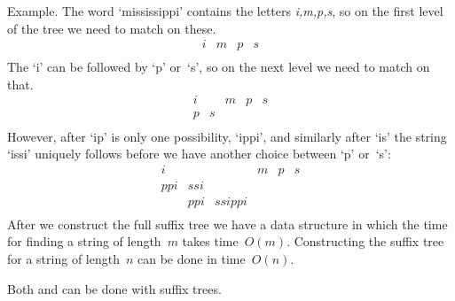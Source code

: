 Example. The word `mississippi' contains the letters \emph{i,m,p,s},
so on the first level of the tree we need to match on these.
\[ 
\begin{array}{*{12}{c}}
i&m&p&s\\
\end{array}
\]
The `i' can be followed by `p' or~`s', so on the next level
we need to match on that.
\[ 
\begin{array}{*{12}{c}}
i& &m&p&s\\
p&s\\
\end{array}
\]
However, after `ip' is only one possibility, `ippi', 
and similarly after `is' the string `issi' uniquely
follows before we have another choice between `p' or~`s':
\[ 
\begin{array}{*{12}{c}}
i  &   &      &m&p&s\\
ppi&ssi\\
   &ppi&ssippi\\
\end{array}
\]
After we construct the full suffix tree we have a data structure
in which the time for finding a string of length~$m$ takes
time~$O(m)$.
Constructing the suffix tree for a string of length~$n$ 
can be done in time~$O(n)$.

Both 
 and  can
be done with suffix trees.

\endinput

\Level 0 {Protein interaction networks}

\Level 0 {Data mining}

From~\cite{wang:undergrad-bioinf-course}
\begin{quotation}
  In our course, a Hadoop based distributed data mining system is used
  in our course to implement some basic data mining algorithms for the
  analysis of various kinds of gene expression datasets, including 36
  time-series gene expression datasets of yeast, 79 tissue- specific
  gene expression datasets of human and so on.
\end{quotation}
